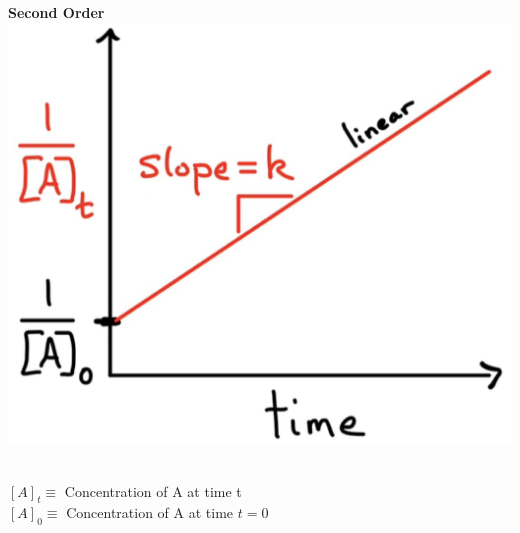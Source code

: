 \begin{minipage}{0.33\linewidth}
    \begin{center}
        \textbf{Second Order}\\
        \includegraphics[width = \linewidth]{images/2nd order.jpeg}\\
        \\
    \end{center}
    
\end{minipage}
\begin{minipage}{0.3\linewidth}
    \begin{center}
    \end{center}
\end{minipage}
\begin{minipage}{0.3\linewidth}
    \begin{center}
        $[A]_t \equiv$ Concentration of A at time t\\
        $[A]_0 \equiv$ Concentration of A at time $t = 0$
    \end{center}
\end{minipage}
